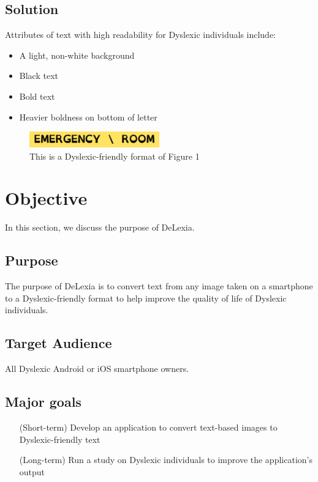 \documentclass[a4paper]{article}
\begin{document}
\subsection{Solution}
Attributes of text with high readability for Dyslexic individuals include:
\begin{itemize}
   \item A light, non-white background
   \item Black text
   \item Bold text
   \item Heavier boldness on bottom of letter
\end{itemize}

\begin{figure}[!htb]
\centering
\includegraphics[width=0.5\textwidth]{good.PNG}
\caption{\label{fig:good} This is a Dyslexic-friendly format of Figure 1}
\end{figure}


\section{Objective}
In this section, we discuss the purpose of DeLexia.

\subsection{Purpose}
The purpose of DeLexia is to convert text from any image taken on a smartphone to a Dyslexic-friendly format to help improve the quality of life of Dyslexic individuals.

\subsection{Target Audience}
All Dyslexic Android or iOS smartphone owners. 

\subsection{Major goals}

\begin{itemize}
  \setlength{\itemindent}{7em}
   \item[(Short-term)] Develop an application to convert text-based images to Dyslexic-friendly text
   \item [(Long-term)] Run a study on Dyslexic individuals to improve the application's output
\end{itemize}
\end{document}
